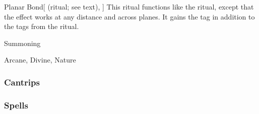 \lowercase{\hypertarget{spell:Planar Bond}{}}\label{spell:Planar Bond}
\begin{attuneability}[Rank 8]{\hypertarget{spell:Planar Bond}{Planar Bond}}[ (ritual; see text), ]
This ritual functions like the  ritual, except that the effect works at any distance and across planes.
It gains the  tag in addition to the tags from the  ritual.
\end{attuneability}
\vspace{0.25em}


\newpage
\begin{spellsection}{Summoning}

\begin{spellheader}
\end{spellheader}


 Arcane, Divine, Nature

\subsubsection{Cantrips}


\end{spellsection}


\subsubsection{Spells}



